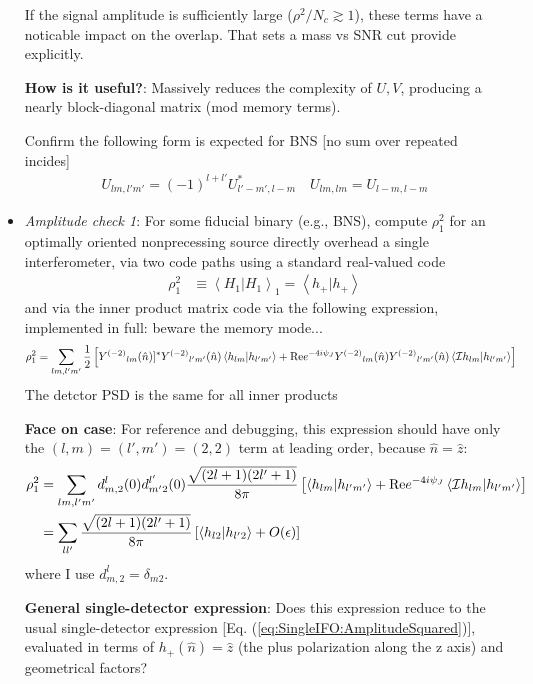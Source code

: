 \documentclass[twocolumn,prd,nofootinbib]{revtex4}
\newcommand\editremark[1]{{\color{red} #1}}
\newcommand\Y[1]{Y^{(#1)}{}}
\newcommand\qmstateproduct[2]{\left\langle#1|#2\right\rangle}
\begin{document}
\begin{widetext}
\begin{itemize}
\begin{shaded}
If the signal amplitude is sufficiently large ($ \rho^2/N_c \gtrsim 1$), these terms have a noticable impact on the
overlap.  That sets a mass vs SNR cut \editremark{provide explicitly}. 

%

\noindent \textbf{How is it useful?}: Massively reduces the complexity of $U,V$, producing a nearly block-diagonal
matrix (mod memory terms).
\end{shaded}

Confirm the following form is expected for BNS [no sum over repeated incides]
\begin{eqnarray}
U_{lm,l'm'} =(-1)^{l+l'}U_{l'-m',l-m}^* \quad  U_{lm,lm} = U_{l-m,l-m}
\end{eqnarray}

\item \emph{Amplitude check 1}: For some fiducial binary (e.g., BNS), compute $\rho_1^2$ for an optimally oriented nonprecessing source directly overhead a
  single interferometer, via two code paths using a standard real-valued code
\begin{align}
\rho^2_1 &\equiv\qmstateproduct{H_1}{H_1}_1 = \qmstateproduct{h_+}{h_+} 
\end{align}
and via the inner product matrix code  via the following expression, implemented in full: \editremark{beware the memory mode...}
\begin{align}
\rho^2_1& = \sum_{lm,l'm'} \frac{1}{2} \left[ \Y{-2}_{lm}(\hat{n})]^*\Y{-2}_{l'm'}(\hat{n})\qmstateproduct{h_{lm}}{h_{l'm'}}
  +\text{Re}e^{-4i\psi_J}\Y{-2}_{lm}(\hat{n})\Y{-2}_{l'm'}(\hat{n})\qmstateproduct{{\cal I}h_{lm}}{h_{l'm'}} \right]
\end{align}
The detctor PSD is the same for all inner products
\begin{shaded}
\noindent \textbf{Face on case}: For reference and debugging, this expression  should have only the $(l,m)=(l',m')=(2,2)$ term at leading order, because $\hat{n}=\hat{z}$:
\begin{align}
 \rho_1^2&= \sum_{lm,l'm'}d^l_{m,2}(0)d^{l'}_{m'2}(0) \frac{\sqrt{(2l+1)(2l'+1)}}{8\pi} \left[\qmstateproduct{h_{lm}}{h_{l'm'}} 
 +  \text{Re}e^{-4i\psi_J}  \qmstateproduct{{\cal I}h_{lm}}{h_{l'm'}}
\right] \\
 &= \sum_{ll'}\frac{\sqrt{(2l+1)(2l'+1)}}{8\pi} \left[\qmstateproduct{h_{l2}}{h_{l'2}}  + O(\epsilon)
\right]
\end{align}
where I use $d^l_{m,2}=\delta_{m2}$.

\noindent \textbf{General single-detector expression}: Does this expression reduce to the usual single-detector
expression [Eq. (\ref{eq:SingleIFO:AmplitudeSquared})], evaluated in terms of $h_{+}(\hat{n})=\hat{z}$ (the plus polarization along the z axis) and geometrical
factors?  
\end{shaded}


\end{itemize}
\end{widetext}
\end{document}
